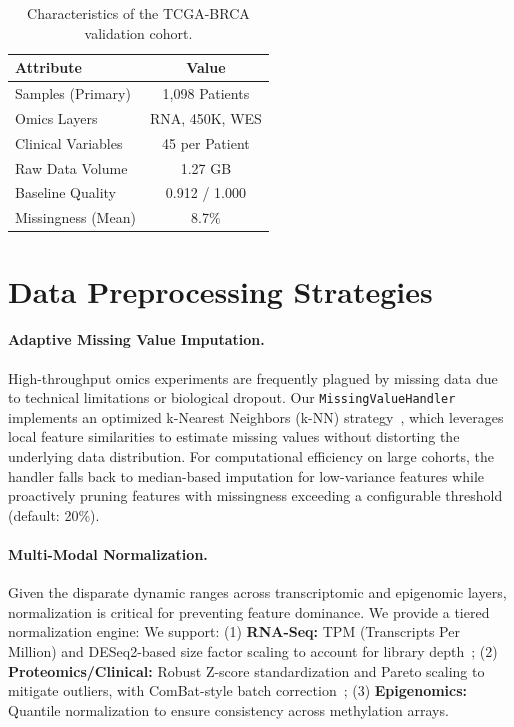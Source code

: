 \documentclass[runningheads]{llncs}
\begin{document}
\begin{table}[H]
\caption{Characteristics of the TCGA-BRCA validation cohort.}\label{tab:dataset}
\centering
\small
\renewcommand{\arraystretch}{0.95}
\begin{tabularx}{\columnwidth}{L C}
\toprule
\textbf{Attribute} & \textbf{Value} \\
\midrule
Samples (Primary)    & 1,098 Patients \\
Omics Layers                & RNA, 450K, WES \\
Clinical Variables          & 45 per Patient \\
Raw Data Volume             & 1.27 GB \\
Baseline Quality            & 0.912 / 1.000 \\
Missingness (Mean)          & 8.7\% \\
\bottomrule
\end{tabularx}
\end{table}

\section{Data Preprocessing Strategies}

\paragraph{Adaptive Missing Value Imputation.}
High-throughput omics experiments are frequently plagued by missing data due to technical limitations or biological dropout. Our \texttt{MissingValueHandler} implements an optimized k-Nearest Neighbors (k-NN) strategy~\cite{troyanskaya2001}, which leverages local feature similarities to estimate missing values without distorting the underlying data distribution. For computational efficiency on large cohorts, the handler falls back to median-based imputation for low-variance features while proactively pruning features with missingness exceeding a configurable threshold (default: 20\%).

\paragraph{Multi-Modal Normalization.}
Given the disparate dynamic ranges across transcriptomic and epigenomic layers, normalization is critical for preventing feature dominance. We provide a tiered normalization engine:
We support: (1) \textbf{RNA-Seq:} TPM (Transcripts Per Million) and DESeq2-based size factor scaling to account for library depth~\cite{ritchie2015}; (2) \textbf{Proteomics/Clinical:} Robust Z-score standardization and Pareto scaling to mitigate outliers, with ComBat-style batch correction~\cite{johnson2007}; (3) \textbf{Epigenomics:} Quantile normalization to ensure consistency across methylation arrays.
\end{document}
